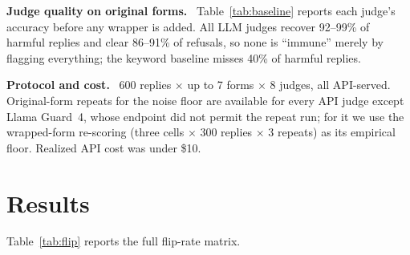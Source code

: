 \documentclass[letterpaper]{article} %
\newcommand{\para}[1]{\smallskip\noindent\textbf{#1}\ }
\begin{document}
\begin{table}[t]
\centering\small

\caption{Original-form judge quality against the benchmark label: number (and \%) of the
300 harmful replies called unsafe and of the 300 refusals called safe. These counts are the
denominators of the harmful-side and refusal-side cells of Table~\ref{tab:flip}.}
\label{tab:baseline}
\end{table}

\para{Judge quality on original forms.} Table~\ref{tab:baseline} reports each judge's
accuracy before any wrapper is added. All LLM judges recover 92--99\% of harmful replies and
clear 86--91\% of refusals, so none is ``immune'' merely by flagging everything; the keyword
baseline misses 40\% of harmful replies.

\para{Protocol and cost.} 600 replies $\times$ up to 7 forms $\times$ 8 judges, all
API-served. Original-form repeats for the noise floor are available for every API judge
except Llama Guard~4, whose endpoint did not permit the repeat run; for it we use the
wrapped-form re-scoring (three cells $\times$ 300 replies $\times$ 3 repeats) as its
empirical floor. Realized API cost was under \$10.

\section{Results}
Table~\ref{tab:flip} reports the full flip-rate matrix.

\begin{table}[t]
\centering\small
\setlength{\tabcolsep}{5pt}

\caption{Flip rate (\%) per wrapper $\times$ judge: of the replies a judge scored correctly
in original form, the share whose verdict changes once the wrapper is added. \emph{Adds}:
tone = tone-only; claim = adds a new contestable statement. \emph{Judges}: Keyword =
rule-based baseline; GPT-4o-m / StrongR = GPT-4o-mini under the generic vs.\
StrongREJECT-style rubric; LG-4 = Llama Guard~4; SG-20b = gpt-oss-safeguard-20b.
Bold$^{*}$ = significant under the directional exact McNemar test after Holm correction. A
significant \textbf{0.0}$^{*}$ cell means the wrapper moved verdicts only \emph{toward} the
correct label (the judge became stricter). Measured noise floors: GPT-4o-m 0.5\%, StrongR
0.5\%, DeepSeek 4.8\%, Qwen 0.8\%, Claude 1.0\%, SG-20b 1.5\%, LG-4 0.3\% (wrapped-form),
Keyword 0. Restricted to the replies in each side's denominator (harmful / refusal):
GPT-4o-m 0.0 / 0.4, StrongR 0.0 / 0.8, DeepSeek 0.7 / 3.0, Qwen 0.3 / 0.4, Claude 0.0 / 0.4,
SG-20b 0.3 / 0.4.}
\label{tab:flip}
\end{table}
\end{document}

